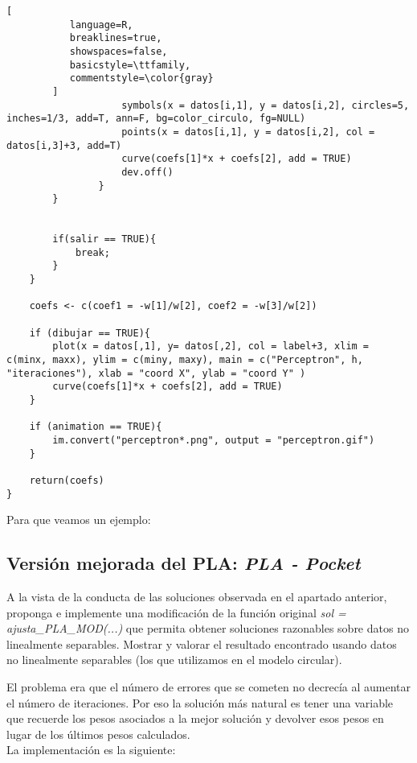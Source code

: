 \documentclass[11pt,fleqn]{book} %
\begin{document}
\begin{lstlisting}[
           language=R,
           breaklines=true,
           showspaces=false,
           basicstyle=\ttfamily,
           commentstyle=\color{gray}
        ]
                    symbols(x = datos[i,1], y = datos[i,2], circles=5, inches=1/3, add=T, ann=F, bg=color_circulo, fg=NULL)
                    points(x = datos[i,1], y = datos[i,2], col = datos[i,3]+3, add=T)
                    curve(coefs[1]*x + coefs[2], add = TRUE)
                    dev.off()
                }
        }

        
        if(salir == TRUE){
            break;
        }
    }
    
    coefs <- c(coef1 = -w[1]/w[2], coef2 = -w[3]/w[2])
    
    if (dibujar == TRUE){
        plot(x = datos[,1], y= datos[,2], col = label+3, xlim = c(minx, maxx), ylim = c(miny, maxy), main = c("Perceptron", h, "iteraciones"), xlab = "coord X", ylab = "coord Y" )
        curve(coefs[1]*x + coefs[2], add = TRUE)
    }
    
    if (animation == TRUE){
        im.convert("perceptron*.png", output = "perceptron.gif")
    }
    
    return(coefs)
}
\end{lstlisting}

Para que veamos un ejemplo:



\subsection{Versión mejorada del PLA: \textit{PLA - Pocket}}

\begin{exercise}
A la vista de la conducta de las soluciones observada en el apartado anterior, proponga e implemente una modificación de la función original \textit{sol = ajusta\_PLA\_MOD(...)} que permita obtener soluciones razonables sobre datos no linealmente separables. Mostrar y valorar el resultado encontrado usando datos no linealmente separables (los que utilizamos en el modelo circular).
\end{exercise}

El problema era que el número de errores que se cometen no decrecía al aumentar el número de iteraciones.
Por eso la solución más natural es tener una variable que recuerde los pesos asociados a la mejor solución y devolver esos pesos en lugar de los últimos pesos calculados.\\
La implementación es la siguiente:\\
\end{document}
